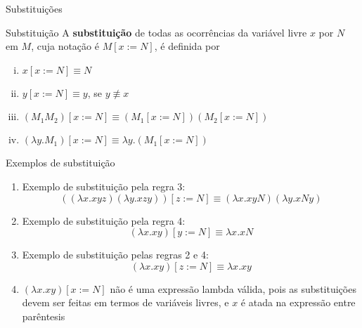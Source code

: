 \begin{frame}[fragile]{Substituições}

    \begin{block}{Substituição}
    A \textbf{substituição} de todas as ocorrências da variável livre $x$ por $N$ em $M$, cuja
    notação é $M[x:=N]$, é definida por
    \begin{enumerate}[i.]
        \item $x[x:=N] \equiv N$
        \item $y[x:=N] \equiv y$, se $y\not\equiv x$
        \item $(M_1M_2)[x:=N] \equiv (M_1[x:=N])(M_2[x:=N])$
        \item $(\lambda y.M_1)[x:=N] \equiv \lambda y.(M_1[x:=N])$
    \end{enumerate}
    \end{block}

\end{frame}

\begin{frame}[fragile]{Exemplos de substituição}

    \begin{enumerate}
        \item Exemplo de substituição pela regra 3:
        \[
            ((\lambda x.xyz)(\lambda y.xzy))[z:=N] \equiv (\lambda x.xyN)(\lambda y.xNy) 
        \]

        \item Exemplo de substituição pela regra 4:
        \[
            (\lambda x.xy)[y:=N] \equiv \lambda x.xN
        \]

        \item Exemplo de substituição pelas regras 2 e 4:
        \[
            (\lambda x.xy)[z:=N] \equiv \lambda x.xy
        \]

        \item $(\lambda x.xy)[x:=N]$ não é uma expressão lambda válida, pois as substituições
            devem ser feitas em termos de variáveis livres, e $x$ é atada na expressão entre
            parêntesis
    \end{enumerate}

\end{frame}


